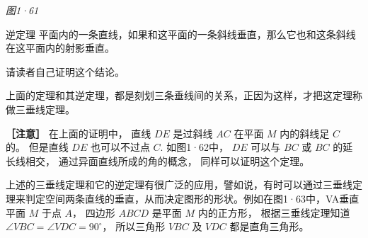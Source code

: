 \emph{图1·61}

逆定理
平面内的一条直线，如果和这平面的一条斜线垂直，那么它也和这条斜线在这平面内的射影垂直。

请读者自己证明这个结论。

上面的定理和其逆定理，都是刻划三条垂线间的关系，正因为这样，才把这定理称做三垂线定理。

\textbf{［注意］} 在上面的证明中， 直线 \(DE\) 是过斜线 \(AC\) 在平面
\(M\) 内的斜线足 \(C\) 的。 但是直线 \(DE\) 也可以不过点 \(C\).
如图1·62中， \(DE\) 可以与 \(BC\) 或 \(BC\) 的延长线相交，
通过异面直线所成的角的概念， 同样可以证明这个定理。

上述的三垂线定理和它的逆定理有很广泛的应用，譬如说，有时可以通过三垂线定理来判定空间两条直线的垂直，从而决定图形的形状。例如在图1·63中，VA垂直平面
\(M\) 于点 \(A\)， 四边形 \(ABCD\) 是平面 \(M\) 内的正方形，
根据三垂线定理知道 \(\angle VBC = \angle VDC = 90^\circ\)， 所以三角形
\(VBC\) 及 \(VDC\) 都是直角三角形。

